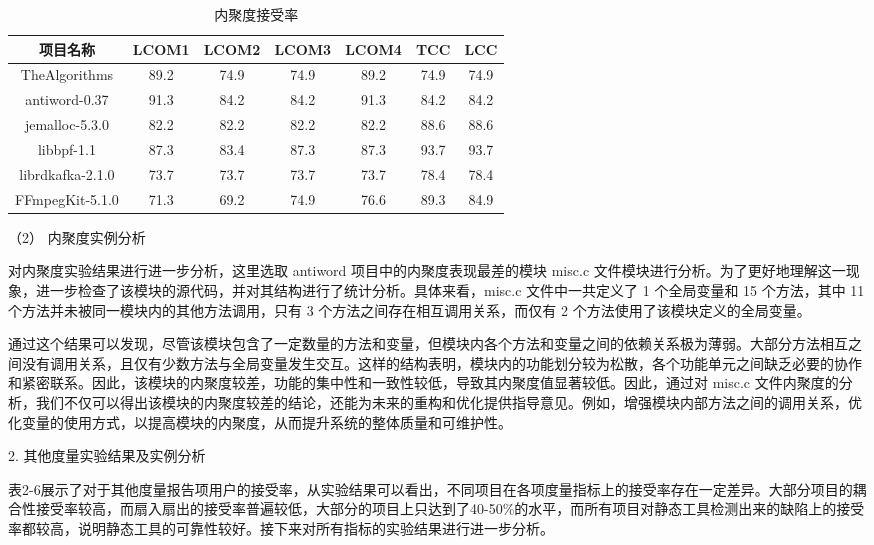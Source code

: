 \begin{table}[htbp]
\caption{内聚度接受率}
\vspace{0.5em}\centering\wuhao
\begin{tabular}{ccccccc}
\toprule
项目名称 & LCOM1 & LCOM2 & LCOM3 & LCOM4 & TCC & LCC \\
\midrule
TheAlgorithms & 89.2 & 74.9 & 74.9 & 89.2 & 74.9 & 74.9 \\
antiword-0.37  & 91.3 & 84.2 & 84.2 & 91.3 & 84.2 & 84.2 \\
jemalloc-5.3.0 & 82.2 & 82.2 & 82.2 & 82.2 & 88.6 & 88.6 \\
libbpf-1.1 & 87.3 & 83.4 & 87.3 & 87.3 & 93.7 &  93.7 \\
librdkafka-2.1.0 & 73.7 & 73.7 & 73.7 & 73.7 & 78.4 & 78.4 \\
FFmpegKit-5.1.0 & 71.3 & 69.2 & 74.9 & 76.6 & 89.3 & 84.9 \\

\bottomrule
\end{tabular}
\end{table}


（2） 内聚度实例分析

对内聚度实验结果进行进一步分析，这里选取 antiword 项目中的内聚度表现最差的模块 misc.c 文件模块进行分析。为了更好地理解这一现象，进一步检查了该模块的源代码，并对其结构进行了统计分析。具体来看，misc.c 文件中一共定义了 1 个全局变量和 15 个方法，其中 11 个方法并未被同一模块内的其他方法调用，只有 3 个方法之间存在相互调用关系，而仅有 2 个方法使用了该模块定义的全局变量。

通过这个结果可以发现，尽管该模块包含了一定数量的方法和变量，但模块内各个方法和变量之间的依赖关系极为薄弱。大部分方法相互之间没有调用关系，且仅有少数方法与全局变量发生交互。这样的结构表明，模块内的功能划分较为松散，各个功能单元之间缺乏必要的协作和紧密联系。因此，该模块的内聚度较差，功能的集中性和一致性较低，导致其内聚度值显著较低。因此，通过对 misc.c 文件内聚度的分析，我们不仅可以得出该模块的内聚度较差的结论，还能为未来的重构和优化提供指导意见。例如，增强模块内部方法之间的调用关系，优化变量的使用方式，以提高模块的内聚度，从而提升系统的整体质量和可维护性。

2. 其他度量实验结果及实例分析

表2-6展示了对于其他度量报告项用户的接受率，从实验结果可以看出，不同项目在各项度量指标上的接受率存在一定差异。大部分项目的耦合性接受率较高，而扇入扇出的接受率普遍较低，大部分的项目上只达到了40-50\%的水平，而所有项目对静态工具检测出来的缺陷上的接受率都较高，说明静态工具的可靠性较好。接下来对所有指标的实验结果进行进一步分析。

